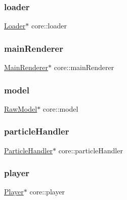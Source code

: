 \mbox{\label{namespacecore_afa1e7446007b3eaf393f3d47487a1782}} 
\subsubsection{\texorpdfstring{loader}{loader}}
{\footnotesize\ttfamily \hyperlink{classcore_1_1Loader}{Loader}$\ast$ core\+::loader}

\mbox{\label{namespacecore_a01adfda2bbace85dc243e5fba0d93b52}} 
\subsubsection{\texorpdfstring{main\+Renderer}{mainRenderer}}
{\footnotesize\ttfamily \hyperlink{classcore_1_1MainRenderer}{Main\+Renderer}$\ast$ core\+::main\+Renderer}

\mbox{\label{namespacecore_aa1479d4ed4dadbfe085b26662122b68a}} 
\subsubsection{\texorpdfstring{model}{model}}
{\footnotesize\ttfamily \hyperlink{classmodel_1_1RawModel}{Raw\+Model}$\ast$ core\+::model}

\mbox{\label{namespacecore_ad86ad607ae7f1f4cd7f425753e39fb5d}} 
\subsubsection{\texorpdfstring{particle\+Handler}{particleHandler}}
{\footnotesize\ttfamily \hyperlink{classparticle_1_1ParticleHandler}{Particle\+Handler}$\ast$ core\+::particle\+Handler}

\mbox{\label{namespacecore_a8130d7cf3bb04bc517651bc3855f8c0f}} 
\subsubsection{\texorpdfstring{player}{player}}
{\footnotesize\ttfamily \hyperlink{classentity_1_1Player}{Player}$\ast$ core\+::player}

